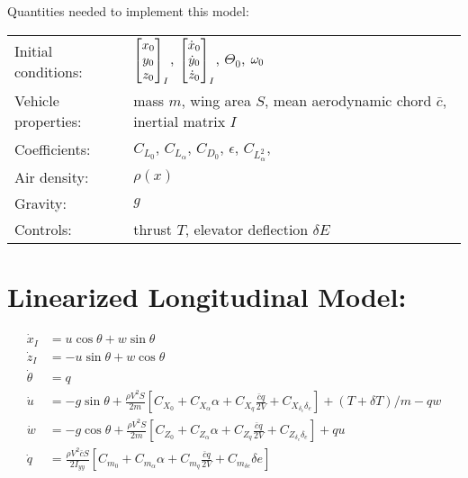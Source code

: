 \documentclass{article}
\newcommand\Vector[1]{\setstackEOL{,}\bracketVectorstack{#1}}
\def\vec#1{{\bf #1}}
\begin{document}
Quantities needed to implement this model: 

\begin{tabular}{lp{4in}}
  Initial conditions: & $\Vector{x_0,y_0,z_0}_I$, $\Vector{\dot{x}_0,\dot{y}_0,\dot{z}_0}_I$,
  $\Theta_0$, $\vec{\omega}_0$\\
  Vehicle properties: & mass $m$, wing area $S$, mean aerodynamic chord $\bar{c}$, inertial matrix $I$\\
  Coefficients: & $C_{L_0}$, $C_{L_\alpha}$, $C_{D_0}$, $\epsilon$, $C_{L_\alpha^2}$, \\
  Air density: & $\rho(x)$ \\
  Gravity: & $g$ \\
  Controls: & thrust $T$, elevator deflection $\delta E$
\end{tabular}
  
\section{Linearized Longitudinal Model:}

\begin{align*}
  \dot{x}_I &= u \cos \theta + w \sin \theta \\
  \dot{z}_I &= -u \sin \theta + w \cos \theta \\
  \dot{\theta} &= q \\
  \dot{u} &= -g \sin \theta + \frac{\rho V^2 S}{2m}\left [ C_{X_0} + C_{X_\alpha}\alpha
    + C_{X_q}\frac{\bar{c}q}{2V} + C_{X_{\delta_e}\delta_e} \right ] + (T+\delta T)/m - qw \\
  \dot{w} &= -g \cos \theta + \frac{\rho V^2 S}{2m}\left [ C_{Z_0} + C_{Z_\alpha}\alpha
    + C_{Z_q}\frac{\bar{c}q}{2V} + C_{Z_{\delta_e} \delta_e} \right ] + qu \\
  \dot{q} &= \frac{\rho V^2\bar{c}S}{2I_{yy}} \left [C_{m_0} + C_{m_\alpha}\alpha + C_{m_q} \frac{\bar{c}q}{2V} + C_{m_{\delta e}} \delta e \right ]   \\
\end{align*}
\end{document}
